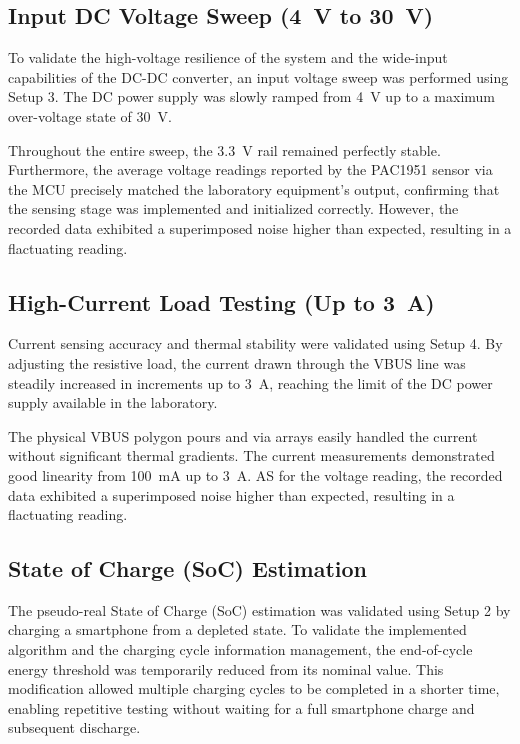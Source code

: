 \subsection{Input DC Voltage Sweep (\SI{4}{\volt} to \SI{30}{\volt})}
To validate the high-voltage resilience of the system and the wide-input capabilities of the DC-DC converter, an input voltage sweep was performed using Setup 3. The DC power supply was slowly ramped from \SI{4}{\volt} up to a maximum over-voltage state of \SI{30}{\volt}. 
\par
Throughout the entire sweep, the \SI{3.3}{\volt} rail remained perfectly stable. Furthermore, the average voltage readings reported by the PAC1951 sensor via the MCU precisely matched the laboratory equipment's output, confirming that the sensing stage was implemented and initialized correctly. However, the recorded data exhibited a superimposed noise higher than expected, resulting in a flactuating reading.

\subsection{High-Current Load Testing (Up to \SI{3}{\ampere})}
Current sensing accuracy and thermal stability were validated using Setup 4. By adjusting the resistive load, the current drawn through the VBUS line was steadily increased in increments up to \SI{3}{\ampere}, reaching the limit of the DC power supply available in the laboratory. 
\par
The physical VBUS polygon pours and via arrays easily handled the current without significant thermal gradients. The current measurements demonstrated good linearity from \SI{100}{\milli\ampere} up to \SI{3}{\ampere}. AS for the voltage reading, the recorded data exhibited a superimposed noise higher than expected, resulting in a flactuating reading.

\subsection{State of Charge (SoC) Estimation}
The pseudo-real State of Charge (SoC) estimation was validated using Setup 2 by charging a smartphone from a depleted state. To validate the implemented algorithm and the charging cycle information management, the end-of-cycle energy threshold was temporarily reduced from its nominal value. This modification allowed multiple charging cycles to be completed in a shorter time, enabling repetitive testing without waiting for a full smartphone charge and subsequent discharge.

